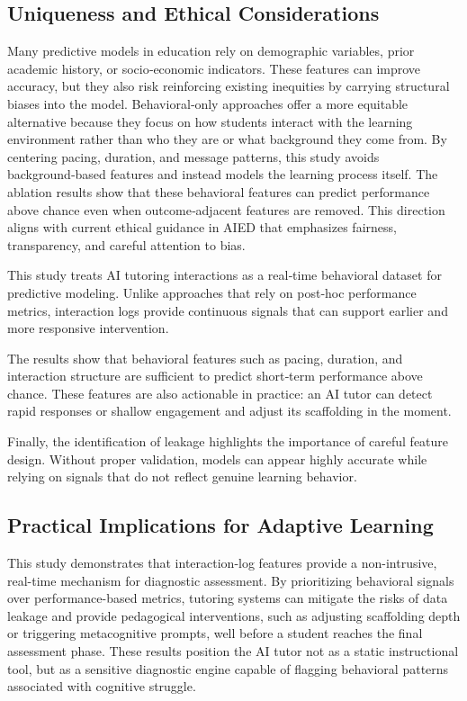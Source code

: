 \documentclass[conference]{IEEEtran}
\begin{document}
\subsection{Uniqueness and Ethical Considerations}

Many predictive models in education rely on demographic variables, prior academic history, or socio‑economic indicators. These features can improve accuracy, but they also risk reinforcing existing inequities by carrying structural biases into the model. Behavioral‑only approaches offer a more equitable alternative because they focus on how students interact with the learning environment rather than who they are or what background they come from. By centering pacing, duration, and message patterns, this study avoids background‑based features and instead models the learning process itself. The ablation results show that these behavioral features can predict performance above chance even when outcome‑adjacent features are removed. This direction aligns with current ethical guidance in AIED that emphasizes fairness, transparency, and careful attention to bias.

This study treats AI tutoring interactions as a real‑time behavioral dataset for predictive modeling. Unlike approaches that rely on post‑hoc performance metrics, interaction logs provide continuous signals that can support earlier and more responsive intervention.

The results show that behavioral features such as pacing, duration, and interaction structure are sufficient to predict short‑term performance above chance. These features are also actionable in practice: an AI tutor can detect rapid responses or shallow engagement and adjust its scaffolding in the moment.

Finally, the identification of leakage highlights the importance of careful feature design. Without proper validation, models can appear highly accurate while relying on signals that do not reflect genuine learning behavior.


\subsection{Practical Implications for Adaptive Learning}

This study demonstrates that interaction-log features provide a non-intrusive, real-time mechanism for diagnostic assessment. By prioritizing behavioral signals over performance-based metrics, tutoring systems can mitigate the risks of data leakage and provide pedagogical interventions, such as adjusting scaffolding depth or triggering metacognitive prompts, well before a student reaches the final assessment phase. These results position the AI tutor not as a static instructional tool, but as a sensitive diagnostic engine capable of flagging behavioral patterns associated with cognitive struggle.
\end{document}
